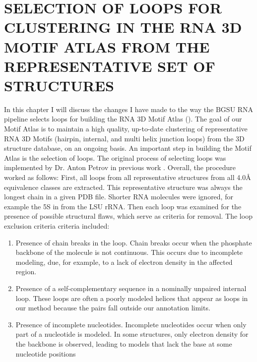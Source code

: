 \chapter{SELECTION OF LOOPS FOR CLUSTERING IN THE RNA 3D MOTIF ATLAS FROM THE
REPRESENTATIVE SET OF STRUCTURES}

In this chapter I will discuss the changes I have made to the way the BGSU RNA
pipeline selects loops for building the RNA 3D Motif Atlas
(). The goal of our Motif Atlas is to
maintain a high quality, up-to-date clustering of representative RNA 3D Motifs
(hairpin, internal, and multi helix junction loops) from the 3D structure
database, on an ongoing basis. An important step in building the Motif Atlas is
the selection of loops. The original process of selecting loops was implemented
by Dr. Anton Petrov in previous work \cite{Petrov2012}. Overall, the procedure
worked as follows: First, all loops from all representative structures from all
4.0{\AA} equivalence classes are extracted. This representative structure was
always the longest chain in a given PDB file. Shorter RNA molecules were
ignored, for example the 5S in from the LSU rRNA. Then each loop was examined
for the presence of possible structural flaws, which serve as criteria for
removal. The loop exclusion criteria criteria included:

\begin{enumerate}
  \item Presence of chain breaks in the loop. Chain breaks occur when the
    phosphate backbone of the molecule is not continuous. This occurs due to
    incomplete modeling, due, for example, to a lack of electron density in the
    affected region.

  \item Presence of a self-complementary sequence in a nominally unpaired
    internal loop. These loops are often a poorly modeled helices that appear as
    loops in our method because the pairs fall outside our annotation limits.

  \item Presence of incomplete nucleotides. Incomplete nucleotides occur when
    only part of a nucleotide is modeled. In some structures, only electron
    density for the backbone is observed, leading to models that lack the base
    at some nucleotide positions
\end{enumerate}


